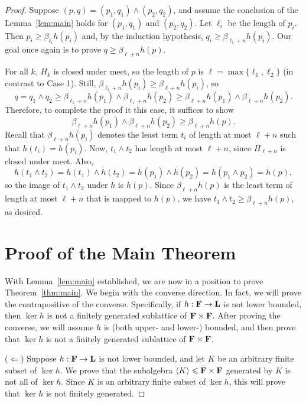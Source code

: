 \begin{proof}
\medskip

 Suppose $(p, q) = (p_1, q_1) \wedge (p_2, q_2)$,
and assume the conclusion of the Lemma~\ref{lem:main} holds 
for $(p_1, q_1)$ and $(p_2, q_2)$.
Let $\ell_i$ be the length of $p_i$.  Then
$p_i\geq \beta_{\ell_i}h(p_i)$ and, by the induction hypothesis,
$q_i\geq \beta_{\ell_i+n}h(p_i)$. Our goal once again is to prove
$q\geq \beta_{\ell+n}h(p)$.

For all $k$, $H_k$ is closed under meet, so 
the length of $p$ is 
$\ell = \max\{\ell_1, \ell_2\}$ (in contrast to Case 1).
Still, 
$\beta_{\ell_i+n}h(p_i) \geq \beta_{\ell+n}h(p_i)$, so
\[
q = q_1\wedge q_2\geq \beta_{\ell_1+n}h(p_1) \wedge \beta_{\ell_1+n}h(p_2)
\geq \beta_{\ell+n}h(p_1) \wedge \beta_{\ell+n}h(p_2).
\]
Therefore, to complete the proof it this case, it suffices to show
\[
\beta_{\ell+n}h(p_1) \wedge \beta_{\ell+n}h(p_2) \geq 
\beta_{\ell+n}h(p).
\]
Recall that $\beta_{\ell+n}h(p_i)$ denotes the least term $t_i$ 
of length at most $\ell +n$ such that $h(t_i) = h(p_i)$. 
Now, $t_1 \wedge t_2$ has length at most $\ell+n$, since $H_{\ell+n}$ is 
closed under meet. Also, 
\[
h(t_1\wedge t_2) = 
h(t_1) \wedge h(t_2) = 
h(p_1) \wedge h(p_2) = 
h(p_1 \wedge p_2) = h(p),
\] 
so the image of $t_1\wedge t_2$ under $h$ is $h(p)$.
Since $\beta_{\ell+n}h(p)$ is the least term of length at 
most $\ell+n$ that is mapped to $h(p)$, we have 
$t_1 \wedge t_2 \geq \beta_{\ell+n}h(p)$, as desired.

\section{Proof of the Main Theorem}
With Lemma~\ref{lem:main} established, we are now in a position to prove 
Theorem~\ref{thm:main}.  We begin with the converse direction.  
In fact, we will prove the contrapositive of the converse.
Specifically, if $h: \mathbf{F} \to \mathbf{L}$ is not lower bounded,
then $\ker h$ is not a finitely generated sublattice of 
$\mathbf{F} \times \mathbf{F}$.  After proving the converse, we will
assume $h$ is (both upper- and lower-) bounded, and then
prove that $\ker h$ is not a finitely generated sublattice of 
$\mathbf{F} \times \mathbf{F}$. 

\medskip


  \noindent ($\Leftarrow$)
  Suppose $h: \mathbf{F} \to \mathbf{L}$ is not lower bounded, 
  and let $K$ be an arbitrary finite subset of $\ker h$.  We prove that the 
  subalgebra $\langle K\rangle\leqslant \mathbf{F} \times \mathbf{F}$ generated by $K$ is not 
  all of $\ker h$.
  Since $K$ is an arbitrary finite subset of $\ker h$, this will prove that 
  $\ker h$ is not finitely generated.


\end{proof}

